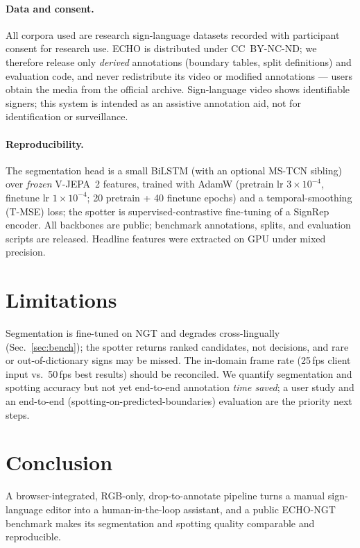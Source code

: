 \documentclass[10pt,twocolumn]{article}
\begin{document}
\paragraph{Data and consent.} All corpora used are research sign-language datasets recorded with
participant consent for research use. ECHO is distributed under CC~BY-NC-ND; we therefore release
only \emph{derived} annotations (boundary tables, split definitions) and evaluation code, and never
redistribute its video or modified annotations --- users obtain the media from the official
archive. Sign-language video shows identifiable signers; this system is intended as an assistive
annotation aid, not for identification or surveillance.

\paragraph{Reproducibility.} The segmentation head is a small BiLSTM (with an optional MS-TCN
sibling) over \emph{frozen} V-JEPA~2 features, trained with AdamW (pretrain lr $3\!\times\!10^{-4}$,
finetune lr $1\!\times\!10^{-4}$; 20 pretrain + 40 finetune epochs) and a temporal-smoothing
(T-MSE) loss; the spotter is supervised-contrastive fine-tuning of a SignRep encoder. All backbones
are public; benchmark annotations, splits, and evaluation scripts are released. Headline features
were extracted on GPU under mixed precision.

\section{Limitations}
Segmentation is fine-tuned on NGT and degrades cross-lingually (Sec.~\ref{sec:bench}); the spotter
returns ranked candidates, not decisions, and rare or out-of-dictionary signs may be missed. The
in-domain frame rate (25\,fps client input vs.\ 50\,fps best results) should be reconciled. We
quantify segmentation and spotting accuracy but not yet end-to-end annotation \emph{time saved};
a user study and an end-to-end (spotting-on-predicted-boundaries) evaluation are the priority next
steps.

\section{Conclusion}
A browser-integrated, RGB-only, drop-to-annotate pipeline turns a manual sign-language editor into
a human-in-the-loop assistant, and a public ECHO-NGT benchmark makes its segmentation and spotting
quality comparable and reproducible.
\end{document}

